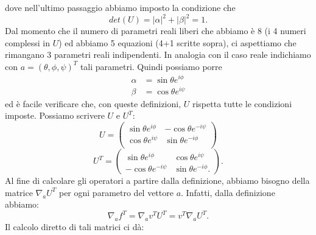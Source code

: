\documentclass[fleqn,italian]{article}
\theoremstyle{definition}
\theoremstyle{remark}
\theoremstyle{plain}%
\theoremstyle{definition}
\theoremstyle{remark}
\numberwithin{equation}{section}
\numberwithin{thm}{section}
\begin{document}
dove nell'ultimo passaggio abbiamo imposto la condizione che 
\begin{equation}
det(U)=|\alpha|^2+|\beta|^2=1.
\end{equation}
Dal momento che il numero di parametri reali liberi che abbiamo \`e 8
(i 4 numeri complessi in $U$) ed abbiamo 5 equazioni (4+1 scritte sopra), ci
aspettiamo che rimangano 3 parametri reali indipendenti. In analogia
con il caso reale indichiamo con $a=(\theta,\phi,\psi)^T$ tali parametri. 
Quindi possiamo porre
\begin{equation}
\begin{split}
\alpha & = \sin\theta e^{i\phi} \\
\beta  & = \cos\theta e^{i\psi}
\end{split}
\end{equation}
ed \`e facile verificare che, con queste definizioni, $U$ rispetta tutte le 
condizioni imposte. Possiamo scrivere $U$ e $U^T$:
\begin{equation}
U=\begin{pmatrix} \sin\theta e^{i\phi} & -\cos\theta e^{-i\psi} \\
                  \cos\theta e^{i\psi} & \sin\theta e^{-i\phi} \\
  \end{pmatrix}
\end{equation}
\begin{equation}
U^T=\begin{pmatrix} \sin\theta e^{i\phi} & \cos\theta e^{i\psi} \\
                    -\cos\theta e^{-i\psi} & \sin\theta e^{-i\phi} .
  \end{pmatrix}.
\end{equation}
Al fine di calcolare gli operatori a partire dalla definizione, abbiamo 
bisogno della matrice $\nabla_a U^T$ per ogni parametro del vettore
 $a$. Infatti, dalla definizione abbiamo:
\begin{equation}
\nabla_a f^T=\nabla_a v^T U^T=v^T\nabla_a U^T.
\end{equation}
Il calcolo diretto di tali matrici ci d\`a:
\end{document}
